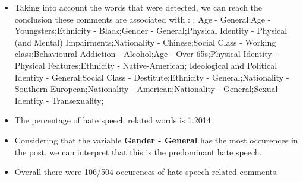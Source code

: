 \documentclass[11pt]{article}
\begin{document}
\begin{itemize}\item Taking into account the words that were detected, we can reach the conclusion these comments are associated with : : Age - General;Age - Youngsters;Ethnicity - Black;Gender - General;Physical Identity - Physical (and Mental) Impairments;Nationality - Chinese;Social Class - Working class;Behavioural Addiction - Alcohol;Age - Over 65s;Physical Identity - Physical Features;Ethnicity - Native-American; Ideological and Political Identity - General;Social Class - Destitute;Ethnicity - General;Nationality - Southern European;Nationality - American;Nationality - General;Sexual Identity - Transexuality;%

\item The percentage of hate speech related words is 1.2014.

\item Considering that the variable \textbf{Gender - General} has the most occurences in the post, we can interpret that this is the predominant hate speech.

\item Overall there were 106/504 occurences of hate speech related comments.\end{itemize}
\end{document}
